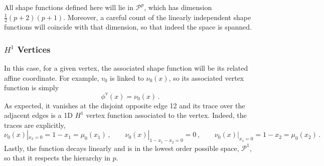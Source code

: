 All shape functions defined here will lie in $\mathcal{P}^{p}$, which has dimension $\frac{1}{2}(p+2)(p+1)$. 
Moreover, a careful count of the linearly independent shape functions will coincide with that dimension, so that indeed the space is spanned.

\subsubsection{\texorpdfstring{$H^1$}{H1} Vertices}

In this case, for a given vertex, the associated shape function will be its related affine coordinate.
For example, $v_0$ is linked to $\nu_0(x)$, so its associated vertex function is simply 
\begin{equation*}
	\phi^\mathrm{v}(x)=\nu_0(x)\,.
\end{equation*}
As expected, it vanishes at the disjoint opposite edge 12 and its trace over the adjacent edges is a 1D $H^1$ vertex function associated to the vertex. 
Indeed, the traces are explicitly,
\begin{equation*}
	\nu_0(x)|_{x_2=0}=1-x_1=\mu_0(x_1)\,,\qquad\nu_0(x)|_{1-x_1-x_2=0}=0\,,\qquad\nu_0(x)|_{x_1=0}=1-x_2=\mu_0(x_2)\,. 
\end{equation*}
Lastly, the function decays linearly and is in the lowest order possible space, $\mathcal{P}^1$, so that it respects the hierarchy in $p$.

